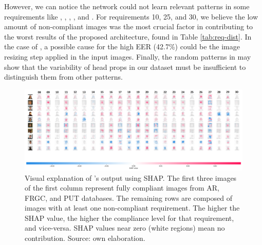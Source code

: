 However, we can notice the network could not learn relevant patterns in some requirements like \inkmarked, \pixelation, \framestooheavy, \hatcap, and \otherfacesortoys. For requirements 10, 25, and 30, we believe the low amount of non-compliant images was the most crucial factor in contributing to the worst results of the proposed architecture, found in Table \ref{tab:req-dist}. In the case of \pixelation, a possible cause for the high EER (42.7\%) could be the image resizing step applied in the input images. Finally, the random patterns in \hatcap may show that the variability of head props in our dataset must be insufficient to distinguish them from other patterns. 

\begin{landscape}
\begin{figure}[t]
\centering
\includegraphics[width=\linewidth]{images/shap.png}
\caption{Visual explanation of \methodname's output using SHAP. The first three images of the first column represent fully compliant images from AR, FRGC, and PUT databases. The remaining rows are composed of images with at least one non-compliant requirement. The higher the SHAP value, the higher the compliance level for that requirement, and vice-versa. SHAP values near zero (white regions) mean no contribution. Source: own elaboration.}
    \label{fig:shap}
\end{figure}
\end{landscape}
